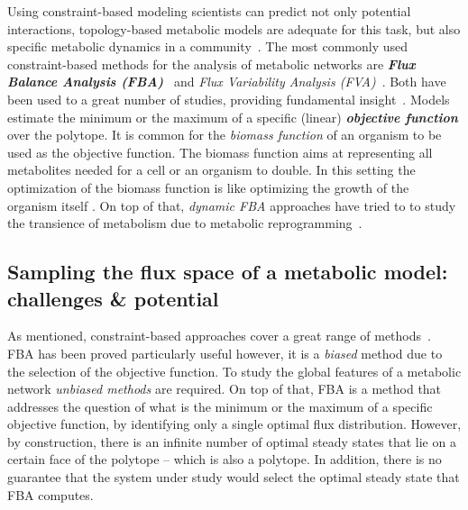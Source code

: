       Using constraint-based modeling scientists can 
      predict not only potential interactions,
      topology-based metabolic models are adequate for this task, 
      but also specific metabolic dynamics in a community~\citep{levy2012reverse}. 
      The most commonly used constraint-based methods for the analysis of metabolic networks
      are \textit{\textbf{Flux Balance Analysis (FBA)}}~\citep{orth2010flux} and 
      \textit{Flux Variability Analysis (FVA)}~\citep{gudmundsson2010computationally}.
      Both have been used to a great number of studies, providing fundamental insight~\citep{ shastri2005flux,chapman2015flux}.
      Models estimate the minimum or the maximum of a specific (linear) \textit{\textbf{objective function}} over the polytope.
      It is common for the \textit{biomass function} of an
      organism to be used as the objective function.  
      The biomass function aims at representing all metabolites needed for a cell or an organism to double.
      In this setting the optimization of the biomass function is like optimizing the growth of the organism itself \citep{feist2010biomass}.
      On top of that, \textit{dynamic FBA} approaches
      have tried to to study the transience of metabolism 
      due to metabolic reprogramming~\citep{mahadevan2002dynamic}.


   \subsection{Sampling the flux space of a metabolic model: challenges \& potential}

      As mentioned, constraint-based approaches cover a great range of methods~\citep{lewis2012constraining}.
      FBA has been proved particularly useful
      however, 
      it is a \textit{biased} method due to the selection
      of the objective function. 
      To study the global features of a metabolic network
      \textit{unbiased methods} are required. 
      On top of that, FBA is a method that addresses the question 
      of what is the minimum or the maximum of a
      specific objective function,
      by identifying only a single optimal flux distribution.
      However, by construction, there is an infinite number of optimal steady states that lie on a certain face of the polytope -- which is also a polytope. 
      In addition, there is no guarantee that the system under study would select 
      the optimal steady state that FBA computes.
      


